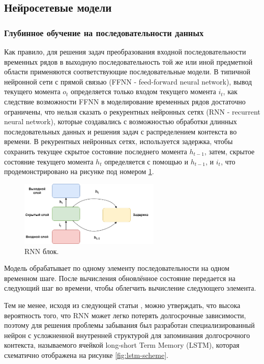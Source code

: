 \newpage

\subsection{Нейросетевые модели}

\subsubsection{Глубинное обучение на последовательности данных}

\par Как правило, для решения задач преобразования входной последовательности временных рядов в выходную последовательность той же или иной предметной области применяются соответствующие последовательные модели. В типичной нейронной сети с прямой связью (FFNN - feed-forward neural network), вывод текущего момента \(o_{t}\) определяется только входом текущего момента \(i_{t}\), как следствие возможности FFNN в моделирование временных рядов достаточно ограничены, что нельзя сказать о рекурентных нейронных сетях (RNN - recurrent neural network), которые создавались с  возможностью обработки длинных последовательных данных и решения задач с распределением контекста во времени.  В рекурентных нейронных сетях, используется задержка, чтобы сохранить текущее скрытое состояние последнего момента \(h_{t-1}\), затем, скрытое состояние текущего момента \(h_{t}\) определяется с помощью и \(h_{t-1}\), и \(i_{t}\), что продемонстрировано на рисунке под номером \ref{fig:RNN-unit}. 

\begin{figure}[hbtp]
  \centering
  \includegraphics[width=0.6\textwidth]{img/RNN-unit.png}
  \caption{RNN блок.}
  \label{fig:RNN-unit}
\end{figure}

\par Модель обрабатывает по одному элементу последовательности на одном
временном шаге. После вычисления обновлённое состояние передается на
следующий шаг во времени, чтобы облегчить вычисление следующего
элемента. 

\par Тем не менее, исходя из следующей статьи \cite{OLD-LSTM}, можно утверждать, что высока вероятность того, что RNN может легко потерять долгосрочные зависимости, поэтому для решения проблемы забывания был разработан специализированный нейрон с усложненной внутренней структурой для запоминания долгосрочного контекста, называемого ячейкой long-short Term Memory (LSTM), которая схематично отображена на рисунке \ref{fig:lstm-scheme}.

